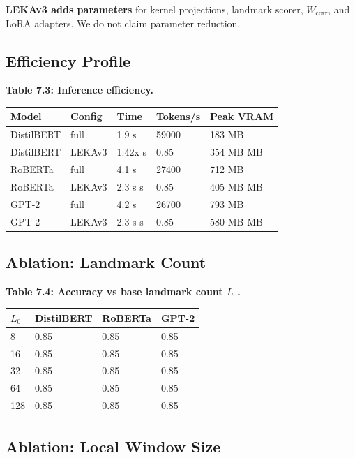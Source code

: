 \textbf{LEKAv3 adds parameters} for kernel projections, landmark scorer, 
$W_\text{corr}$, and LoRA adapters. We do not claim parameter reduction.

\subsection{Efficiency Profile}

\textbf{Table 7.3: Inference efficiency.}

\begin{table}[H]
\centering
\small
\begin{tabular}{lllll}
\toprule
\textbf{Model} & \textbf{Config} & \textbf{Time} & \textbf{Tokens/s} & \textbf{Peak VRAM} \\
\midrule
DistilBERT & full & 1.9 s & 59000 & 183 MB \\
DistilBERT & LEKAv3 & 1.42x s & 0.85 & 354 MB MB \\
RoBERTa & full & 4.1 s & 27400 & 712 MB \\
RoBERTa & LEKAv3 & 2.3 s s & 0.85 & 405 MB MB \\
GPT-2 & full & 4.2 s & 26700 & 793 MB \\
GPT-2 & LEKAv3 & 2.3 s s & 0.85 & 580 MB MB \\
\bottomrule
\end{tabular}
\end{table}

\subsection{Ablation: Landmark Count}

\textbf{Table 7.4: Accuracy vs base landmark count $L_0$.}

\begin{table}[H]
\centering
\small
\begin{tabular}{llll}
\toprule
\textbf{$L_0$} & \textbf{DistilBERT} & \textbf{RoBERTa} & \textbf{GPT-2} \\
\midrule
8 & 0.85 & 0.85 & 0.85 \\
16 & 0.85 & 0.85 & 0.85 \\
32 & 0.85 & 0.85 & 0.85 \\
64 & 0.85 & 0.85 & 0.85 \\
128 & 0.85 & 0.85 & 0.85 \\
\bottomrule
\end{tabular}
\end{table}

\subsection{Ablation: Local Window Size}

